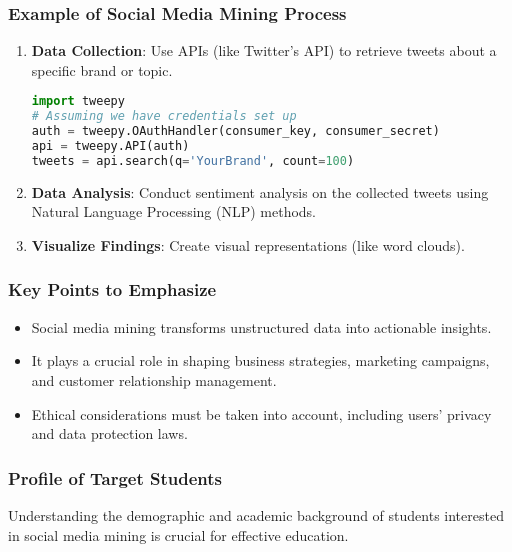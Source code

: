 \documentclass{beamer}
\begin{document}
\begin{frame}[fragile]
    \frametitle{Example of Social Media Mining Process}
    \begin{enumerate}
        \item \textbf{Data Collection}: Use APIs (like Twitter’s API) to retrieve tweets about a specific brand or topic. 
        \begin{lstlisting}[language=python]
import tweepy
# Assuming we have credentials set up
auth = tweepy.OAuthHandler(consumer_key, consumer_secret)
api = tweepy.API(auth)
tweets = api.search(q='YourBrand', count=100)
        \end{lstlisting}
        
        \item \textbf{Data Analysis}: Conduct sentiment analysis on the collected tweets using Natural Language Processing (NLP) methods.
        
        \item \textbf{Visualize Findings}: Create visual representations (like word clouds).
    \end{enumerate}
\end{frame}

\begin{frame}[fragile]
    \frametitle{Key Points to Emphasize}
    \begin{itemize}
        \item Social media mining transforms unstructured data into actionable insights.
        \item It plays a crucial role in shaping business strategies, marketing campaigns, and customer relationship management.
        \item Ethical considerations must be taken into account, including users' privacy and data protection laws.
    \end{itemize}
\end{frame}

\begin{frame}[fragile]
    \frametitle{Profile of Target Students}
    Understanding the demographic and academic background of students interested in social media mining is crucial for effective education.
\end{frame}
\end{document}
